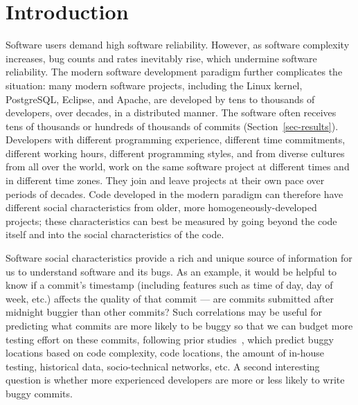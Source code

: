 
\section{Introduction}

Software users demand high software reliability. However, as software complexity
increases, bug counts and rates inevitably rise, which undermine software
reliability. The modern software development paradigm further complicates the
situation: many modern software projects, including the Linux kernel,
PostgreSQL, Eclipse, and Apache, are developed by tens to thousands of
developers, over decades, in a distributed manner. The software often receives
tens of thousands or hundreds of thousands of commits
(Section~\ref{sec-results}). Developers with different programming experience,
different time commitments, different working hours, different programming
styles, and from diverse cultures from all over the world, work on the same
software project at different times and in different time zones. They join and
leave projects at their own pace over periods of decades. Code developed in the
modern paradigm can therefore have different social characteristics from older,
more homogeneously-developed projects; these characteristics can best be
measured by going beyond the code itself and into the social characteristics of the code. %

Software social characteristics provide a rich and unique source of information for us to
understand software and its bugs. As an example, it would be helpful to know if
a commit's timestamp (including features such as time of day, day of week, etc.)
affects the quality of that commit --- are commits submitted after midnight
buggier than other commits?  Such correlations may be useful for predicting what
commits are more likely to be buggy so that we can budget more testing effort on
these commits, following prior studies~\cite{graves00predicting, guo04robust,
Hassan09, libre07, devNetwork08, predictionMenzies10, effort03,
ostrand05predicting, depGraph08, zimmermann-promise-2007}, which predict buggy
locations based on code complexity, code locations, the amount of in-house
testing, historical data, socio-technical networks, etc.  A second interesting
question is whether more experienced developers are more or less likely to write
buggy commits.


